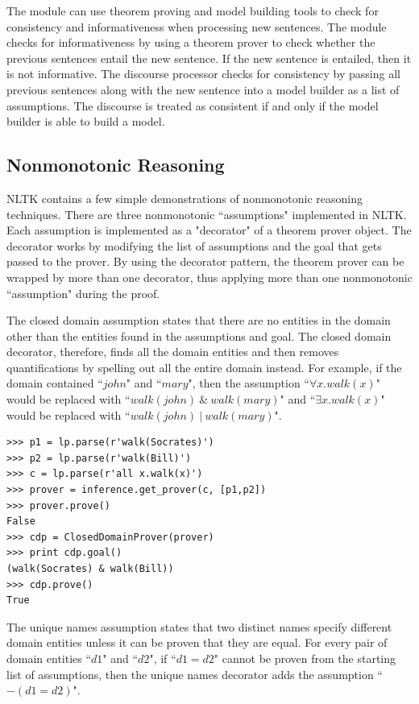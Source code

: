 \documentclass[11pt]{article}
\begin{document}
The module can use theorem proving and model building tools to check for consistency and informativeness when processing new sentences.  The module checks for informativeness by using a theorem prover to check whether the previous sentences entail the new sentence.  If the new sentence is entailed, then it is not informative.  The discourse processor checks for consistency by passing all previous sentences along with the new sentence into a model builder as a list of assumptions.  The discourse is treated as consistent if and only if the model builder is able to build a model.

\subsection{Nonmonotonic Reasoning}
NLTK contains a few simple demonstrations of nonmonotonic reasoning techniques.  There are three nonmonotonic ``assumptions" implemented in NLTK.  Each assumption is implemented as a "decorator" of a theorem prover object.  The decorator works by modifying the list of assumptions and the goal that gets passed to the prover.  By using the decorator pattern, the theorem prover can be wrapped by more than one decorator, thus applying more than one nonmonotonic ``assumption" during the proof.

The closed domain assumption states that there are no entities in the domain other than the entities found in the assumptions and goal.  The closed domain decorator, therefore, finds all the domain entities and then removes quantifications by spelling out all the entire domain instead.  For example, if the domain contained ``$john$" and ``$mary$", then the assumption ``$\forall x.walk(x)$" would be replaced with ``$walk(john)~\&~walk(mary)$" and ``$\exists x.walk(x)$" would be replaced with ``$walk(john)~|~walk(mary)$".

\begin{verbatim}
>>> p1 = lp.parse(r'walk(Socrates)')
>>> p2 = lp.parse(r'walk(Bill)')
>>> c = lp.parse(r'all x.walk(x)')
>>> prover = inference.get_prover(c, [p1,p2])
>>> prover.prove()
False
>>> cdp = ClosedDomainProver(prover)
>>> print cdp.goal()
(walk(Socrates) & walk(Bill))
>>> cdp.prove()
True
\end{verbatim}

The unique names assumption states that two distinct names specify different domain entities unless it can be proven that they are equal.  For every pair of domain entities ``$d1$" and ``$d2$", if ``$d1 = d2$" cannot be proven from the starting list of assumptions, then the unique names decorator adds the assumption ``$-(d1 = d2)$".
\end{document}

